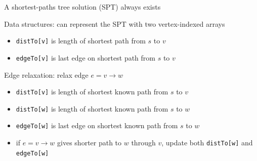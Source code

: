 \documentclass[8pt,a4paper,compress]{beamer}
\begin{document}
\begin{frame}[fragile]
\pause

A shortest-paths tree solution (SPT) always exists

\pause
\bigskip

Data structures: can represent the SPT with two vertex-indexed arrays
\begin{itemize}
\item \lstinline{distTo[v]} is length of shortest path from $s$ to $v$

\item \lstinline{edgeTo[v]} is last edge on shortest path from $s$ to $v$
\end{itemize}

\begin{center}
\end{center}

\pause
\bigskip

Edge relaxation: relax edge $e = v\to w$
\begin{itemize}
\item \lstinline{distTo[v]} is length of shortest known path from $s$ to $v$

\item \lstinline{distTo[w]} is length of shortest known path from $s$ to $w$

\item \lstinline{edgeTo[w]} is last edge on shortest known path from $s$ to $w$

\item if $e = v\to w$ gives shorter path to $w$ through $v$, update both \lstinline{distTo[w]} and \lstinline{edgeTo[w]}
\end{itemize}
\end{frame}
\end{document}
